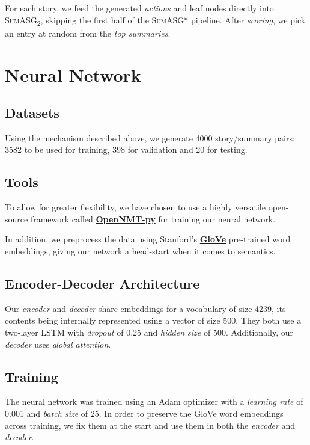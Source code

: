 For each story, we feed the generated \textit{actions} and leaf nodes directly into \textsc{SumASG\textsubscript{2}}, skipping the first half of the \textsc{SumASG*} pipeline. After \textit{scoring}, we pick an entry at random from the \textit{top summaries}.

\section{Neural Network}

\subsection{Datasets}

Using the mechanism described above, we generate 4000 story/summary pairs: 3582 to be used for training, 398 for validation and 20 for testing.

\subsection{Tools}

To allow for greater flexibility, we have chosen to use a highly versatile open-source framework called \textbf{\href{https://github.com/OpenNMT/OpenNMT-py}{OpenNMT-py}} for training our neural network.

In addition, we preprocess the data using Stanford's \textbf{\href{https://nlp.stanford.edu/projects/glove/}{GloVe}} pre-trained word embeddings, giving our network a head-start when it comes to semantics.

\subsection{Encoder-Decoder Architecture}

Our \textit{encoder} and \textit{decoder} share embeddings for a vocabulary of size 4239, its contents being internally represented using a vector of size 500. They both use a two-layer LSTM with \textit{dropout} of 0.25 and \textit{hidden size} of 500. Additionally, our \textit{decoder} uses \textit{global attention}.

\subsection{Training}

The neural network was trained using an Adam optimizer with a \textit{learning rate} of 0.001 and \textit{batch size} of 25. In order to preserve the GloVe word embeddings across training, we fix them at the start and use them in both the \textit{encoder} and \textit{decoder}.

